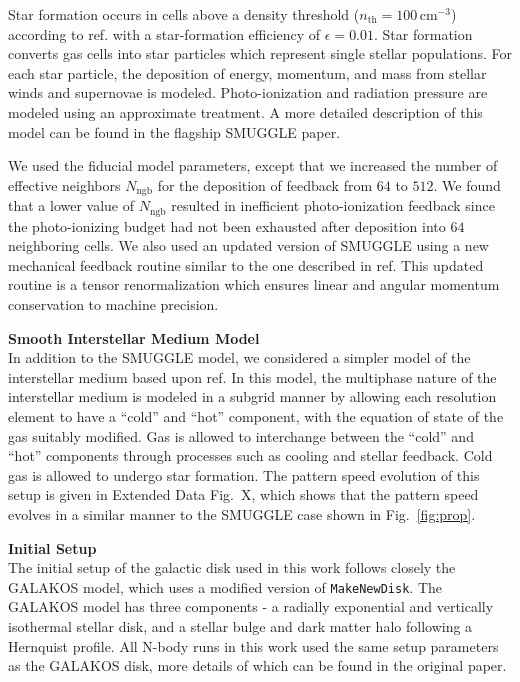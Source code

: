 \documentclass{natureprintstyle}
\begin{document}
Star formation occurs in cells above a density threshold
($n_{\textrm{th}}=100\,\textrm{cm}^{-3}$) according to
ref.\cite{2003MNRAS.339..289S} with a star-formation efficiency of $\epsilon =
0.01$. Star formation converts gas cells into star particles which represent
single stellar populations. For each star particle, the deposition of energy,
momentum, and mass from stellar winds and supernovae is modeled.
Photo-ionization and radiation pressure are modeled using an approximate
treatment. A more detailed description of this model can be found in the
flagship SMUGGLE paper.\cite{2019MNRAS.489.4233M}

We used the fiducial model parameters, except that we increased the number of
effective neighbors $N_{\textrm{ngb}}$ for the deposition of feedback from
$64$ to $512$. We found that a lower value of $N_{\textrm{ngb}}$ resulted in
inefficient photo-ionization feedback since the photo-ionizing budget had not
been exhausted after deposition into $64$ neighboring cells. We also used an
updated version of SMUGGLE using a new mechanical feedback routine similar to
the one described in ref.\cite{2018MNRAS.480..800H} This updated routine is a
tensor renormalization which ensures linear and angular momentum conservation
to machine precision.

\vspace{12pt}

\noindent
{\bf Smooth Interstellar Medium Model}
\\
\noindent
In addition to the SMUGGLE model, we considered a simpler model of the
interstellar medium based upon ref.\cite{2003MNRAS.339..289S} In this model,
the multiphase nature of the interstellar medium is modeled in a subgrid
manner by allowing each resolution element to have a ``cold'' and ``hot''
component, with the equation of state of the gas suitably modified. Gas is
allowed to interchange between the ``cold'' and ``hot'' components through
processes such as cooling and stellar feedback. Cold gas is allowed to undergo
star formation. The pattern speed evolution of this setup is given in Extended
Data Fig.~X, which shows that the pattern speed evolves in a similar manner to
the SMUGGLE case shown in Fig.~\ref{fig:prop}.

\vspace{12pt}

\noindent
{\bf Initial Setup}
\\
\noindent
The initial setup of the galactic disk used in this work follows closely the
GALAKOS model\cite{2020ApJ...890..117D}, which uses a modified version of
\texttt{MakeNewDisk}.\cite{2005MNRAS.361..776S} The GALAKOS model has three
components - a radially exponential and vertically isothermal stellar disk,
and a stellar bulge and dark matter halo following a Hernquist
profile.\cite{1990ApJ...356..359H} All N-body runs in this work used the same
setup parameters as the GALAKOS disk, more details of which can be found in
the original paper.
\end{document}
